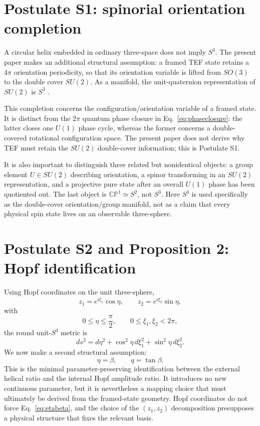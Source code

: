 \documentclass[10pt,twocolumn]{article}
\begin{document}
\section{Postulate S1: spinorial orientation completion}
\label{sec:s1}

A circular helix embedded in ordinary three-space does not imply $S^3$.  The present paper makes
an additional structural assumption: a framed TEF state retains a $4\pi$ orientation periodicity,
so that its orientation variable is lifted from $SO(3)$ to the double cover $SU(2)$.  As a manifold,
the unit-quaternion representation of $SU(2)$ is $S^3$ \cite{Nakahara2003}.

This completion concerns the configuration/orientation variable of a framed state.  It is distinct
from the $2\pi$ quantum phase closure in Eq.~\eqref{eq:phaseclosure}: the latter closes one $U(1)$
phase cycle, whereas the former concerns a double-covered rotational configuration space.  The
present paper does not derive why TEF must retain the $SU(2)$ double-cover information; this is
Postulate S1.

It is also important to distinguish three related but nonidentical objects: a group element
$U\in SU(2)$ describing orientation, a spinor transforming in an $SU(2)$ representation, and a
projective pure state after an overall $U(1)$ phase has been quotiented out.  The last object is
$\mathbb{CP}^1\simeq S^2$, not $S^3$.  Here $S^3$ is used specifically as the double-cover
orientation/group manifold, not as a claim that every physical spin state lives on an observable
three-sphere.

\section{Postulate S2 and Proposition 2: Hopf identification}

Using Hopf coordinates on the unit three-sphere,
\begin{equation}
 z_1=e^{i\xi_1}\cos\eta,
 \qquad
 z_2=e^{i\xi_2}\sin\eta,
\label{eq:hopf}
\end{equation}
with
\begin{equation}
0\le\eta\le\frac{\pi}{2},
\qquad
0\le\xi_1,\xi_2<2\pi,
\end{equation}
the round unit-$S^3$ metric is
\begin{equation}
ds^2=d\eta^2+\cos^2\eta\,d\xi_1^2+\sin^2\eta\,d\xi_2^2.
\label{eq:s3metric}
\end{equation}
We now make a second structural assumption:
\begin{equation}
\boxed{\eta=\beta,\qquad q=\tan\beta.}
\label{eq:etabeta}
\end{equation}
This is the minimal parameter-preserving identification between the external helical ratio and the
internal Hopf amplitude ratio.  It introduces no new continuous parameter, but it is nevertheless a
mapping choice that must ultimately be derived from the framed-state geometry.  Hopf coordinates
do not force Eq.~\eqref{eq:etabeta}, and the choice of the $(z_1,z_2)$ decomposition presupposes a
physical structure that fixes the relevant basis.
\end{document}

